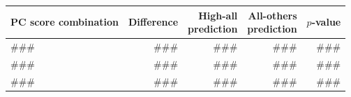 \begin{table}[h]
\label{tab:pc_score_combo_k3_top3}
\begin{tabular}{p{5.5cm}rrrr}
\toprule
PC score combination & Difference & \shortstack{High-all\\prediction} & \shortstack{All-others\\prediction} & $p$-value \\
\midrule
### & ### & ### & ### & ### \\
### & ### & ### & ### & ### \\
### & ### & ### & ### & ### \\
\bottomrule
\end{tabular}
\end{table}
